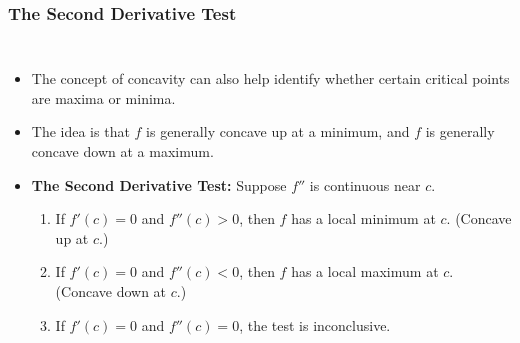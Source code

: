 \documentclass[serif,ignorenonframetext]{beamer}
\begin{document}
\begin{frame}
  \frametitle{The Second Derivative Test}
  \begin{columns}
  \begin{itemize}[<+->]
  \item The concept of concavity can also help
    identify whether certain critical points
    are maxima or minima.
  \item The idea is that $f$ is generally
    concave up at a minimum, and $f$ is generally
    concave down at a maximum.
  \item \textbf{The Second Derivative Test:}
    Suppose $f''$ is continuous near $c$.
    \begin{enumerate}
    \item If $f'(c)=0$ and $f''(c)>0$, then $f$
      has a local minimum at $c$. (Concave up at $c$.)
    \item If $f'(c)=0$ and $f''(c)<0$, then $f$
      has a local maximum at $c$.  (Concave down at $c$.)
    \item If $f'(c)=0$ and $f''(c)=0$, the test is
      inconclusive.
    \end{enumerate}
  \end{itemize}
  \end{columns}
\end{frame}
\end{document}
